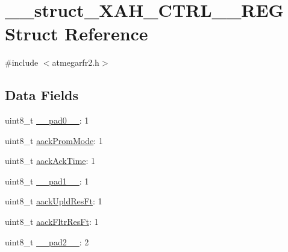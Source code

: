 \hypertarget{struct____struct___x_a_h___c_t_r_l__1___r_e_g}{\section{\-\_\-\-\_\-struct\-\_\-\-X\-A\-H\-\_\-\-C\-T\-R\-L\-\_\-\_\-\-R\-E\-G Struct Reference}
\label{struct____struct___x_a_h___c_t_r_l__1___r_e_g}
}


{\ttfamily \#include $<$atmegarfr2.\-h$>$}

\subsection*{Data Fields}
\begin{DoxyCompactItemize}
\item 
uint8\-\_\-t \hyperlink{struct____struct___x_a_h___c_t_r_l__1___r_e_g_ab47c251ecbe339b5b9cfbb44e8e6e073}{\-\_\-\-\_\-pad0\-\_\-\-\_\-}\-: 1
\item 
uint8\-\_\-t \hyperlink{struct____struct___x_a_h___c_t_r_l__1___r_e_g_a4704e4c4c573a692a87c621a9945135e}{aack\-Prom\-Mode}\-: 1
\item 
uint8\-\_\-t \hyperlink{struct____struct___x_a_h___c_t_r_l__1___r_e_g_aab63655976b2e5a903f9166f999c571d}{aack\-Ack\-Time}\-: 1
\item 
uint8\-\_\-t \hyperlink{struct____struct___x_a_h___c_t_r_l__1___r_e_g_a9c6a6739908cd736a355625d2118070d}{\-\_\-\-\_\-pad1\-\_\-\-\_\-}\-: 1
\item 
uint8\-\_\-t \hyperlink{struct____struct___x_a_h___c_t_r_l__1___r_e_g_a47d950ecbdd3c5aa3944ab363d20add4}{aack\-Upld\-Res\-Ft}\-: 1
\item 
uint8\-\_\-t \hyperlink{struct____struct___x_a_h___c_t_r_l__1___r_e_g_a3e137119d9451eaf9ae9f145f3602146}{aack\-Fltr\-Res\-Ft}\-: 1
\item 
uint8\-\_\-t \hyperlink{struct____struct___x_a_h___c_t_r_l__1___r_e_g_a4665793b8bee53374d6564b14efb8b13}{\-\_\-\-\_\-pad2\-\_\-\-\_\-}\-: 2
\end{DoxyCompactItemize}


